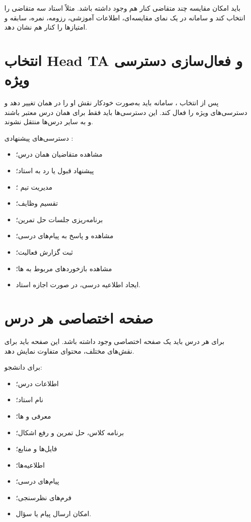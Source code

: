 \documentclass[12pt,a4paper]{article}
\begin{document}
باید امکان مقایسه چند متقاضی کنار هم وجود داشته باشد. مثلاً استاد سه متقاضی را انتخاب کند و سامانه در یک نمای مقایسه‌ای، اطلاعات آموزشی، رزومه، نمره، سابقه و امتیازها را کنار هم نشان دهد.

\section{انتخاب Head TA و فعال‌سازی دسترسی ویژه}
پس از انتخاب ، سامانه باید به‌صورت خودکار نقش او را در همان  تغییر دهد و دسترسی‌های ویژه را فعال کند. این دسترسی‌ها باید فقط برای همان درس معتبر باشند و به سایر درس‌ها منتقل نشوند.

دسترسی‌های پیشنهادی :
\begin{itemize}
\item مشاهده متقاضیان  همان درس؛
\item پیشنهاد قبول یا رد به استاد؛
\item مدیریت تیم ؛
\item تقسیم وظایف؛
\item برنامه‌ریزی جلسات حل تمرین؛
\item مشاهده و پاسخ به پیام‌های درسی؛
\item ثبت گزارش فعالیت؛
\item مشاهده بازخوردهای مربوط به ها؛
\item ایجاد اطلاعیه درسی، در صورت اجازه استاد.
\end{itemize}

\section{صفحه اختصاصی هر درس}
برای هر درس باید یک صفحه اختصاصی وجود داشته باشد. این صفحه باید برای نقش‌های مختلف، محتوای متفاوت نمایش دهد.

برای دانشجو:
\begin{itemize}
\item اطلاعات درس؛
\item نام استاد؛
\item معرفی  و ها؛
\item برنامه کلاس، حل تمرین و رفع اشکال؛
\item فایل‌ها و منابع؛
\item اطلاعیه‌ها؛
\item پیام‌های درسی؛
\item فرم‌های نظرسنجی؛
\item امکان ارسال پیام یا سؤال.
\end{itemize}
\end{document}
